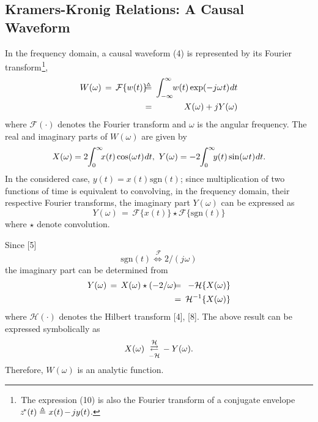 \documentclass[journal]{IEEEtran}
\begin{document}
\subsection{Kramers-Kronig Relations: A Causal Waveform}
In the frequency domain, a causal waveform (4) is represented by its Fourier transform$\mspace{1mu}${\footnote {\,The expression (10) is also the Fourier transform of a conjugate envelope
 $z^{\!*}(t) \triangleq \mspace{1mu} x(t)\mspace{-2mu}-\mspace{-2mu}jy(t)$.}}, 
\begin{eqnarray}
	W(\omega)\, = \,\mathcal{F}\{w(t)\} \mspace{-9mu}&\triangleq&\mspace{-9mu}
	\int_{-\infty}^{\infty}\mspace{-5mu}
	w(t) \exp(-j \omega\mspace{1mu} t) \mspace{1mu} dt \nonumber \\
		\mspace{-9mu}&=&\mspace{-7mu}	X(\omega) + j Y(\omega)
\end{eqnarray}
where $\mathcal{F}(\cdot)$ denotes the Fourier transform and $\omega$ is the angular frequency. The real and imaginary parts of $W(\omega)$ are	given by
\begin{equation*}
	X(\omega) = 2\mspace{-4mu}\int_{0}^{\infty}\mspace{-8mu}
	x(t) \cos(\omega\mspace{1mu} t) \mspace{1mu} dt, \,\,   
	Y(\omega) = -2\mspace{-4mu}\int_{0}^{\infty}\mspace{-8mu}
	y(t) \sin(\omega\mspace{1mu} t) \mspace{1mu} dt .
\end{equation*}
In the considered case, $y(t) = x(t)\mspace{1mu}\mathrm{sgn}(t)$; since multiplication of two functions of time is equivalent to convolving, in the frequency domain, their respective Fourier transforms, the imaginary part $Y(\omega)$ can be expressed as
\begin{equation}
	Y(\omega)\, = \, \mathcal{F}\{x(t)\} \star \mathcal{F}\{\mathrm{sgn}(t)\}
\end{equation}
where $\star$ denote convolution.

Since [5]
\begin{equation}
	\mathrm{sgn}(t)	\stackrel{{}\mspace{4mu}\mathcal{F}}{\iff}2/(j\mspace{1mu}\omega)
\end{equation}
the imaginary part can be determined from
\begin{eqnarray}
	Y(\omega)\, = \, X(\omega) \star (-2/\omega)
	\mspace{-9mu}&=&\mspace{-9mu} -\mathcal{H}\{X(\omega)\} \nonumber \\
	\mspace{-9mu}&=&\mspace{-9mu} {\mathcal{H}}^{-1}\{X(\omega)\} 
\end{eqnarray}
where $\mathcal{H}(\cdot)$ denotes the Hilbert transform [4], [8].
The above result can be expressed symbolically as
\begin{equation}
	X(\omega)\,\,\, {\Large{
		{\substack{\scriptscriptstyle{{\mathcal{H}}}\\
	{{\rightleftarrows}}\\
		\scriptscriptstyle{-\mathcal{H}}} 
	}} 	\, -Y(\omega)}.
\end{equation}
Therefore, $W(\omega)$ is an analytic function. 
\end{document}
